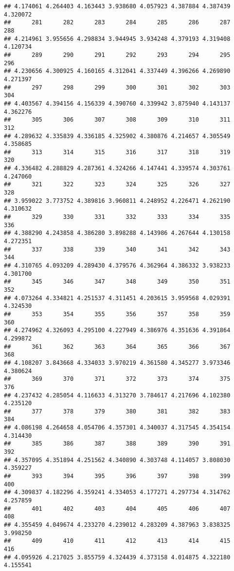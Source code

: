 \documentclass[
]{article}
\begin{document}
\begin{verbatim}
## 4.174061 4.264403 4.163443 3.938680 4.057923 4.387884 4.387439 4.320072 
##      281      282      283      284      285      286      287      288 
## 4.214961 3.955656 4.298834 3.944945 3.934248 4.379193 4.319408 4.120734 
##      289      290      291      292      293      294      295      296 
## 4.230656 4.300925 4.160165 4.312041 4.337449 4.396266 4.269890 4.271397 
##      297      298      299      300      301      302      303      304 
## 4.403567 4.394156 4.156339 4.390760 4.339942 3.875940 4.143137 4.362276 
##      305      306      307      308      309      310      311      312 
## 4.289632 4.335839 4.336185 4.325902 4.380876 4.214657 4.305549 4.358685 
##      313      314      315      316      317      318      319      320 
## 4.336482 4.288829 4.287361 4.324266 4.147441 4.339574 4.303761 4.247060 
##      321      322      323      324      325      326      327      328 
## 3.959022 3.773752 4.389816 3.960811 4.248952 4.226471 4.262190 4.310632 
##      329      330      331      332      333      334      335      336 
## 4.388290 4.243858 4.386280 3.898288 4.143986 4.267644 4.130158 4.272351 
##      337      338      339      340      341      342      343      344 
## 4.310765 4.093209 4.289430 4.379576 4.362964 4.386332 3.938233 4.301700 
##      345      346      347      348      349      350      351      352 
## 4.073264 4.334821 4.251537 4.311451 4.203615 3.959568 4.029391 4.324530 
##      353      354      355      356      357      358      359      360 
## 4.274962 4.326093 4.295100 4.227949 4.386976 4.351636 4.391864 4.299872 
##      361      362      363      364      365      366      367      368 
## 4.108207 3.843668 4.334033 3.970219 4.361580 4.345277 3.973346 4.380624 
##      369      370      371      372      373      374      375      376 
## 4.237432 4.285054 4.116633 4.313270 3.784617 4.217696 4.102380 4.235120 
##      377      378      379      380      381      382      383      384 
## 4.086198 4.264658 4.054706 4.357301 4.340037 4.317545 4.354154 4.314430 
##      385      386      387      388      389      390      391      392 
## 4.357095 4.351894 4.251562 4.340890 4.303748 4.114057 3.808030 4.359227 
##      393      394      395      396      397      398      399      400 
## 4.309837 4.182296 4.359241 4.334053 4.177271 4.297734 4.314762 4.257859 
##      401      402      403      404      405      406      407      408 
## 4.355459 4.049674 4.233270 4.239012 4.283209 4.387963 3.838325 3.998250 
##      409      410      411      412      413      414      415      416 
## 4.095926 4.217025 3.855759 4.324439 4.373158 4.014875 4.322180 4.155541 

\end{verbatim}
\end{document}
